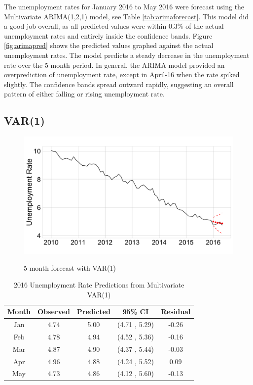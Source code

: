 \documentclass[twoside,twocolumn]{article}
\begin{document}
The unemployment rates for January 2016 to May 2016 were forecast using the Multivariate ARIMA(1,2,1) model, see Table \ref{tab:arimaforecast}.  This model did a good job overall, as all predicted values were within 0.3\% of the actual unemployment rates and entirely inside the confidence bands.  Figure \ref{fig:arimapred} shows the predicted values graphed against the actual unemployment rates. The model predicts a steady decrease in the unemployment rate over the 5 month period.  In general, the ARIMA model provided an overprediction of unemployment rate, except in April-16 when the rate spiked slightly. The confidence bands spread outward rapidly, suggesting an overall pattern of either falling or rising unemployment rate.

\subsection{VAR(1)}

   \begin{figure}[htb]
    	\centering
     	\caption{5 month forecast with VAR(1)}
     	\includegraphics[width=\linewidth]{images/varpred}
     	\label{fig:varpred}
 \end{figure}
 
\begin{table}[ht]
\centering
\small
\caption{2016 Unemployment Rate Predictions from Multivariate VAR(1)}
\label{tab:varforecast}
\begin{tabular}{ccccc}
  \hline
Month & Observed & Predicted& 95\% CI  & Residual \\ 
  \hline
Jan  & 4.74 & 5.00 & (4.71 , 5.29) & -0.26 \\ 
Feb & 4.78 & 4.94 & (4.52 , 5.36) & -0.16 \\ 
Mar  & 4.87 & 4.90 & (4.37 , 5.44) & -0.03 \\ 
Apr & 4.96 & 4.88 & (4.24 , 5.52) & 0.09 \\ 
May & 4.73 & 4.86 & (4.12 , 5.60) & -0.13 \\ 
   \hline
\end{tabular}
\end{table}
\end{document}

